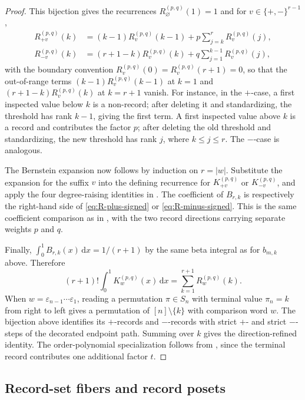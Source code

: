 \documentclass[10pt,a4paper]{amsart}
\newcommand{\dd}{\,\mathrm{d}}
\newcommand{\eps}{\varepsilon}
\begin{document}
\begin{proof}
This bijection gives the recurrences $R_\varnothing^{(p,q)}(1)=1$ and for \(v\in\{+,-\}^{r-1}\),
\begin{align}
R_{+v}^{(p,q)}(k)
&=(k-1)R_v^{(p,q)}(k-1)
  +p\sum_{j=k}^{r}R_v^{(p,q)}(j),
\label{eq:R-plus-signed}\\
R_{-v}^{(p,q)}(k)
&=(r+1-k)R_v^{(p,q)}(k)
  +q\sum_{j=1}^{k-1}R_v^{(p,q)}(j),
\label{eq:R-minus-signed}
\end{align}
with the boundary convention \(R_v^{(p,q)}(0)=R_v^{(p,q)}(r+1)=0\), so that the
out-of-range terms \((k-1)R_v^{(p,q)}(k-1)\) at \(k=1\) and
\((r+1-k)R_v^{(p,q)}(k)\) at \(k=r+1\) vanish.  For instance, in the
\(+\)-case, a first inspected value below \(k\) is a
non-record; after deleting it and standardizing, the threshold has rank
\(k-1\), giving the first term.  A first inspected value above \(k\) is a
record and contributes the factor \(p\); after deleting the old threshold and
standardizing, the new threshold has rank \(j\), where \(k\le j\le r\).  The
\(-\)-case is analogous.

The Bernstein expansion now follows by induction on \(r=|w|\).  Substitute
the expansion for the suffix \(v\) into the defining recurrence for
\(K_{+v}^{(p,q)}\) or \(K_{-v}^{(p,q)}\), and apply the four degree-raising
identities in .  The coefficient of \(B_{r,k}\) is
respectively the right-hand side of \eqref{eq:R-plus-signed} or
\eqref{eq:R-minus-signed}.  This is the same coefficient comparison as in
, with the two record directions carrying separate
weights \(p\) and \(q\).

Finally, \(\int_0^1B_{r,k}(x)\dd x=1/(r+1)\) by the same beta integral as for
\(b_{m,k}\) above.  Therefore
\[
(r+1)!\int_0^1K_w^{(p,q)}(x)\dd x
=
\sum_{k=1}^{r+1}R_w^{(p,q)}(k).
\]
When \(w=\eps_{n-1}\cdots\eps_1\), reading a permutation
\(\pi\in S_n\) with terminal value \(\pi_n=k\) from right to left gives a
permutation of \([n]\setminus\{k\}\) with comparison word \(w\).  The bijection
above identifies its \(+\)-records and \(-\)-records with strict \(+\)- and
strict \(-\)-steps of the decorated endpoint path.  Summing over \(k\) gives
the direction-refined identity.  The order-polynomial specialization follows
from , since the terminal record contributes one additional
factor \(t\).
\end{proof}

\subsection{Record-set fibers and record posets}
\label{sec:record-set-fibers}
\end{document}
